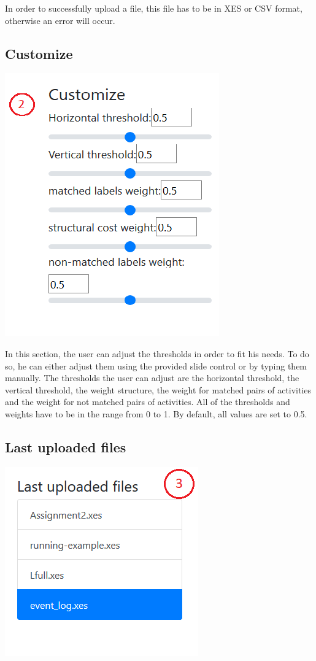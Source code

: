 \documentclass[notitlepage]{article}
\begin{document}
\begin{flushleft}
In order to successfully upload a file, this file has to be in XES or CSV format, otherwise an error will occur. 



\subsection{Customize}

\includegraphics[scale=0.6]{customize.png}

In this section, the user can adjust the thresholds in order to fit his needs. 
To do so, he can either adjust them using the provided slide control or by typing them manually. 
The thresholds the user can adjust are the horizontal threshold, the vertical threshold, the weight structure, the weight for matched pairs of activities and the weight for not matched pairs of activities. 
All of the thresholds and weights have to be in the range from 0 to 1.
By default, all values are set to 0.5.

\subsection{Last uploaded files}

\includegraphics[scale=0.6]{lastUploadedFiles.png}


\end{flushleft}
\end{document}
